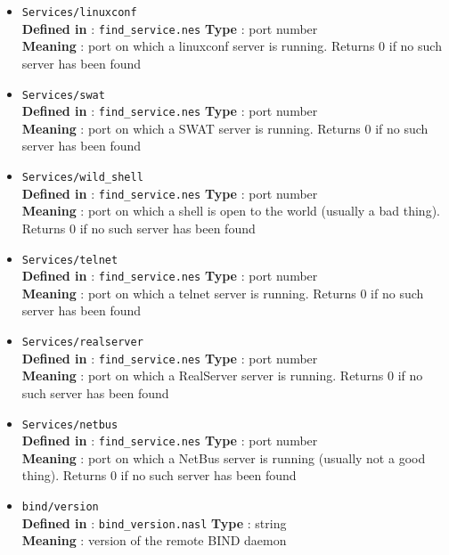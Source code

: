 \documentclass{article}
\begin{document}
\begin{itemize}
\item \verb+Services/linuxconf+\\
\textbf{Defined in} : \verb+find_service.nes+
\textbf{Type} : port number\\
\textbf{Meaning} : port on which a linuxconf server is running. Returns 0 if no
such server has been found


\item \verb+Services/swat+\\
\textbf{Defined in} : \verb+find_service.nes+
\textbf{Type} : port number\\
\textbf{Meaning} : port on which a SWAT server is running. Returns 0 if no
such server has been found

\item \verb+Services/wild_shell+\\
\textbf{Defined in} : \verb+find_service.nes+
\textbf{Type} : port number\\
\textbf{Meaning} : port on which a shell is open to the world (usually
a bad thing). Returns 0 if no such server has been found

\item \verb+Services/telnet+\\
\textbf{Defined in} : \verb+find_service.nes+
\textbf{Type} : port number\\
\textbf{Meaning} : port on which a telnet server is running. Returns 0 if no
such server has been found

\item \verb+Services/realserver+\\
\textbf{Defined in} : \verb+find_service.nes+
\textbf{Type} : port number\\
\textbf{Meaning} : port on which a RealServer server is running. Returns 0 if no
such server has been found

\item \verb+Services/netbus+\\
\textbf{Defined in} : \verb+find_service.nes+
\textbf{Type} : port number\\
\textbf{Meaning} : port on which a NetBus server is running (usually not
a good thing). Returns 0 if no such server has been found


\item \verb+bind/version+\\
\textbf{Defined in} : \verb+bind_version.nasl+
\textbf{Type} : string\\
\textbf{Meaning} : version of the remote BIND daemon



\end{itemize}
\end{document}
